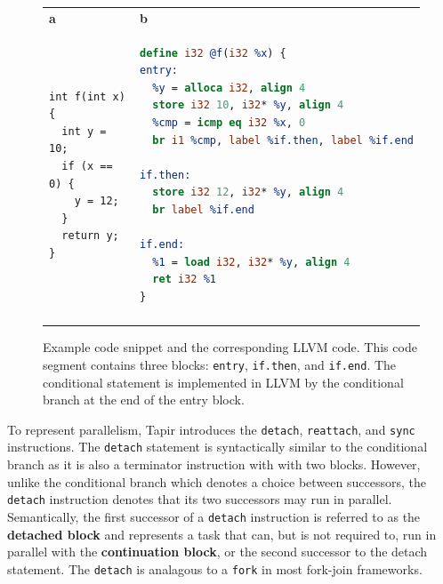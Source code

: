 \documentclass[sigconf]{acmart}
\newcommand{\figlabel}[1]   {\label{fig:#1}}
\newcommand{\subfiglabel}[1]    {\textbf{#1}}
\def\code{\lstinline[basicstyle=\ttfamily\color{CodeColor}]}
\begin{document}
\begin{figure}[h!]
  \begin{tabular*}{\linewidth}{@{\extracolsep{\fill}}ll}

    \subfiglabel{a} & \subfiglabel{b} \\
\begin{minipage}[T]{0.45\linewidth}
      \begin{lstlisting}
int f(int x) {
  int y = 10;
  if (x == 0) {
    y = 12;
  }
  return y;
}
      \end{lstlisting}
    \end{minipage}
&
    \begin{minipage}[T]{0.45\linewidth}
\begin{lstlisting}[language=llvm]
define i32 @f(i32 %x) {
entry:
  %y = alloca i32, align 4
  store i32 10, i32* %y, align 4
  %cmp = icmp eq i32 %x, 0
  br i1 %cmp, label %if.then, label %if.end

if.then:
  store i32 12, i32* %y, align 4
  br label %if.end

if.end:
  %1 = load i32, i32* %y, align 4
  ret i32 %1
}
\end{lstlisting}
    \end{minipage}\\
    \addlinespace[2ex]
    \bottomrule
  \end{tabular*}
  \caption{Example code snippet and the corresponding LLVM code. This code segment contains three blocks: \code{entry}, \code{if.then}, and \code{if.end}. The conditional statement is implemented in LLVM by the conditional branch at the end of the entry block. }
  \figlabel{CFG}
  \vspace{-.4cm}
\end{figure}

To represent parallelism, Tapir introduces the \code{detach}, \code{reattach}, and
\code{sync} instructions. The \code{detach} statement is syntactically similar to
the conditional branch as it is also a terminator instruction with with two blocks.
However, unlike the conditional branch which denotes a choice between successors, the \code{detach} instruction denotes that its two successors may run in parallel. Semantically,
the first successor of a \code{detach} instruction is referred to as the \textbf{detached block} and represents a task that can, but is not required to, run in parallel with the
\textbf{continuation block}, or the second successor to the detach statement. The \code{detach}
is analagous to a \code{fork} in most fork-join frameworks.
\end{document}
